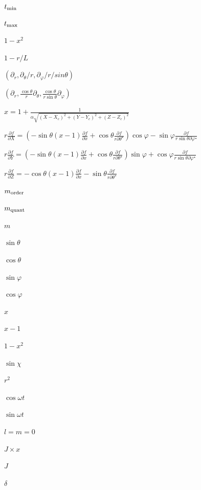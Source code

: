 \documentclass{article}
\begin{document}
$ t_{\rm min} $
\pagebreak

$ t_{\rm max} $
\pagebreak

$1-x^2$
\pagebreak

$ 1 - r/L$
\pagebreak

$(\partial_r, \partial_\theta /r , \partial_\varphi/r/sin\theta)$
\pagebreak

$(\partial_r, \frac{\cos \theta}{r} \partial_\theta , \frac{\cos \theta}{r \sin \theta} \partial_\varphi)$
\pagebreak

$ x = 1 + \displaystyle\frac{1}{\alpha\sqrt{(X-X_c)^2+(Y-Y_c)^2+(Z-Z_c)^2}} $
\pagebreak

$ r\displaystyle\frac{\partial f}{\partial X} = (-\sin\theta (x-1) \displaystyle\frac{\partial f}{\partial x} + \cos\theta \displaystyle\frac{\partial f}{r\partial \theta^\star}) \cos\varphi - \sin\varphi \displaystyle\frac{\partial f}{r\sin\theta \partial \varphi^\star} $
\pagebreak

$ r\displaystyle\frac{\partial f}{\partial Y} = (-\sin\theta (x-1) \displaystyle\frac{\partial f}{\partial x} + \cos\theta \displaystyle\frac{\partial f}{r\partial \theta^\star}) \sin\varphi + \cos\varphi \displaystyle\frac{\partial f}{r\sin\theta \partial \varphi^\star} $
\pagebreak

$ r\displaystyle\frac{\partial f}{\partial Z} = -\cos\theta (x-1) \displaystyle\frac{\partial f}{\partial x} - \sin\theta\displaystyle\frac{\partial f}{r\partial \theta^\star}$
\pagebreak

$m_{\rm order}$
\pagebreak

$m_{\rm quant}$
\pagebreak

$m$
\pagebreak

$ \sin \theta $
\pagebreak

$ \cos \theta $
\pagebreak

$ \sin \varphi $
\pagebreak

$ \cos \varphi $
\pagebreak

$ x $
\pagebreak

$ x-1 $
\pagebreak

$ 1-x^2 $
\pagebreak

$ \sin \chi $
\pagebreak

$r^2$
\pagebreak

$\cos \omega t$
\pagebreak

$\sin \omega t$
\pagebreak

$l=m=0$
\pagebreak

$ J \times x$
\pagebreak

$J$
\pagebreak

$\delta$
\pagebreak
\end{document}
